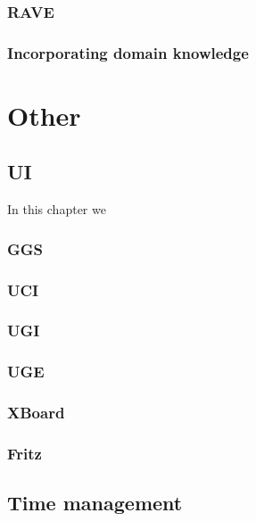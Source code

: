 \documentclass[10pt,dvipdfmx]{report}
\begin{document}
\section{RAVE}

\section{Incorporating domain knowledge}



\part{Other}

\chapter{UI}
\label{chap-ui}

In this chapter we 

\section{GGS}
\section{UCI}
\section{UGI}
\section{UGE}
\section{XBoard}
\section{Fritz}

\chapter{Time management}
\label{chap-time}
\end{document}
